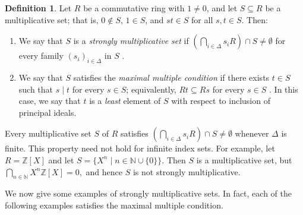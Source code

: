 \documentclass[11pt]{amsart}
\theoremstyle{definition}
\newtheorem{definition}[theorem]{Definition}
\theoremstyle{remark}
\begin{document}
\begin{definition}\label{definition}
Let $R$ be a commutative ring with $1\neq 0$, and let $S\subseteq R$ be a multiplicative set; that is, $0\notin S$, $1\in S$, and $st\in S$ for all $s,t\in S$. Then:
\begin{enumerate}
\item We say that $S$ is a \textit{strongly multiplicative set} if
$\left(\bigcap_{i\in\Delta} s_iR\right)\cap S\neq\emptyset$
for every family $(s_i)_{i\in\Delta}$ in $S$ \cite{Hamed}.

\item We say that $S$ satisfies the \textit{maximal multiple condition} if there exists $t\in S$ such that $s\mid t$ for every $s\in S$; equivalently, $Rt\subseteq Rs$ for every $s\in S$ \cite{Anderson}. In this case, we say that $t$ is a \emph{least} element of $S$ with respect to inclusion of principal ideals.
\end{enumerate}
\end{definition}

Every multiplicative set $S$ of $R$ satisfies
$\left(\bigcap_{i\in\Delta} s_iR\right)\cap S\neq\emptyset$
whenever $\Delta$ is finite. This property need not hold for infinite index sets. For example, let $R=\mathbb{Z}[X]$ and let $S=\{X^n\mid n\in\mathbb{N}\cup\{0\}\}$. Then $S$ is a multiplicative set, but
$\bigcap_{n\in\mathbb{N}} X^n\mathbb{Z}[X]=0,$
and hence $S$ is not strongly multiplicative.

We now give some examples of strongly multiplicative sets. In fact, each of the following examples satisfies the maximal multiple condition.
\end{document}
